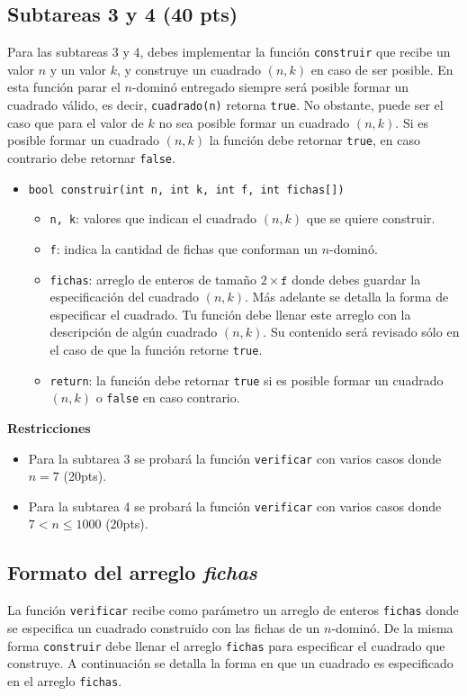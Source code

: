 \documentclass{oci}
\begin{document}
\subsection*{Subtareas 3 y 4 (40 pts)}
Para las subtareas 3 y 4, debes implementar la función \verb+construir+ que recibe un valor $n$ y un valor $k$, y construye un cuadrado $(n,k)$ en caso de ser posible.
En esta función parar el $n$-dominó entregado siempre será posible formar un cuadrado válido, es decir, \verb+cuadrado(n)+ retorna \verb+true+.
No obstante, puede ser el caso que para el valor de $k$ no sea posible formar un cuadrado $(n,k)$.
Si es posible formar un cuadrado $(n,k)$ la función debe retornar \verb+true+, en caso contrario debe retornar \verb+false+.
\begin{itemize}
 \item \verb+bool construir(int n, int k, int f, int fichas[])+
 \begin{itemize}
  \item \verb+n, k+: valores que indican el cuadrado $(n,k)$ que se quiere construir.
  \item \verb+f+: indica la cantidad de fichas que conforman un $n$-dominó.
  \item \verb+fichas+: arreglo de enteros de tamaño $2\times\texttt{f}$ donde debes guardar la especificación del cuadrado $(n,k)$. Más adelante se detalla la forma de especificar el cuadrado.
    Tu función debe llenar este arreglo con la descripción de algún cuadrado $(n,k)$.
Su contenido será revisado sólo en el caso de que la función retorne \verb+true+.
  \item \verb+return+: la función debe retornar \verb+true+ si es posible formar un cuadrado $(n,k)$ o \verb+false+ en caso contrario.
 \end{itemize}
\end{itemize}
{\bf Restricciones}
\vspace{-0.6em}
\begin{itemize}
\item Para la subtarea 3 se probará la función \verb+verificar+ con varios casos donde $n= 7$ (20pts).
\item Para la subtarea 4 se probará la función \verb+verificar+ con varios casos donde $7 < n\leq 1000$ (20pts).
\end{itemize}

\subsection*{Formato del arreglo \emph{fichas}}
La función \verb+verificar+ recibe como parámetro un arreglo de enteros \verb+fichas+ donde se especifica un cuadrado construido con las fichas de un $n$-dominó.
De la misma forma \verb+construir+ debe llenar el arreglo \verb+fichas+ para especificar el cuadrado que construye.
A continuación se detalla la forma en que un cuadrado es especificado en el arreglo \verb+fichas+.
\end{document}
